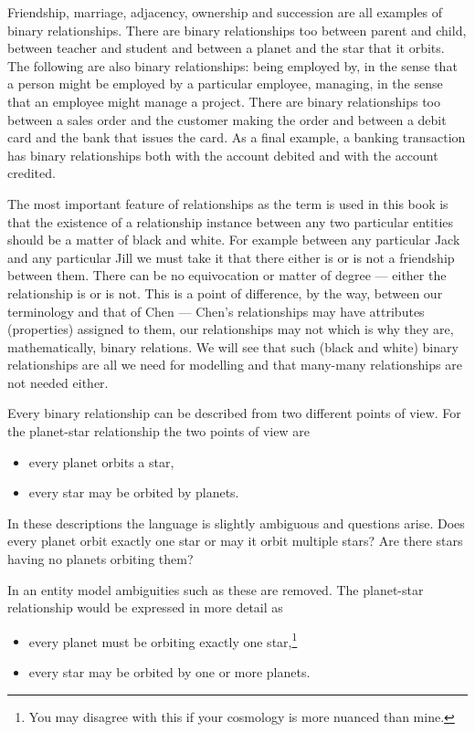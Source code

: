 \mynote
Friendship,  marriage, adjacency, ownership and succession are all examples of binary relationships. There are binary relationships too  between parent and child, between teacher and student and between a planet and the star that it orbits.   
The following are also binary relationships:
being employed by, in the sense that a person might be employed by a particular employee,
managing, in the sense that an employee might manage a project. 
There are binary relationships too between a sales order and the customer making the order and between a debit card and  the bank that issues the card. As a final example, a banking transaction has binary relationships both with the account debited and with the account credited. 

\mynote The most important feature of relationships as the term is used  in this book is that the existence of a relationship instance between any two particular entities should be a matter of black and white. For example between any particular Jack and any particular Jill we must take it that there either is or is not a friendship between them. There can be no equivocation or matter of degree --- either the relationship is or is not. This is a point of difference, by the way, between our terminology and that of Chen --- Chen's relationships may have attributes (properties) assigned to them, our relationships may not which is why they are, mathematically, binary relations. We will see that such (black and white) binary relationships are all we need for modelling and that many-many relationships are not needed either. 

\mynote 
Every binary relationship can be described from two different points of view. 
For the planet-star relationship the two points of view are
\begin{itemize}
\item every planet orbits a star,
\item every star may be orbited by planets.
\end{itemize}

In these descriptions the language is slightly ambiguous and questions arise.
Does every planet orbit exactly one star or may it orbit multiple stars? Are there  stars having no planets orbiting them?

In an entity model ambiguities such as these are removed. 
The planet-star relationship would be expressed in more detail as
\begin{itemize}
\item every planet must be orbiting exactly one star,\footnote{You may disagree with this if your cosmology is more nuanced than mine.}
\item every star may be orbited by one or more planets.
\end{itemize}

